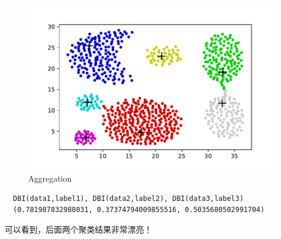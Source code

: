 \documentclass[UTF8,a4paper,AutoFakeBold,AutoFakeSlant]{article}
\begin{document}
\begin{figure}[H]
	\centering
	\includegraphics[scale=0.625]{cluster3.pdf}
	\caption{Aggregation}
	\label{f:Aggregation}
\end{figure}

\begin{mdframed}[hidealllines=true,backgroundcolor=shadecolor]
\begin{verbatim}
  DBI(data1,label1), DBI(data2,label2), DBI(data3,label3)
  (0.781987832988031, 0.37374794009855516, 0.5035680502991704)
\end{verbatim}
\end{mdframed}

可以看到，后面两个聚类结果非常漂亮！




















% 
% 
% 
\end{document}

